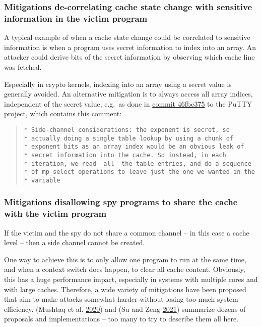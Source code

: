 \documentclass[a4paper,]{report}
\begin{document}
\hypertarget{mitigations-de-correlating-cache-state-change-with-sensitive-information-in-the-victim-program}{%
\subsubsection{Mitigations de-correlating cache state change with
sensitive information in the victim
program}\label{mitigations-de-correlating-cache-state-change-with-sensitive-information-in-the-victim-program}}

A typical example of when a cache state change could be correlated to
sensitive information is when a program uses secret information to index
into an array. An attacker could derive bits of the secret information
by observing which cache line was fetched.

Especially in crypto kernels, indexing into an array using a secret
value is generally avoided. An alternative mitigation is to always
access all array indices, independent of the secret value, e.g.~as done
in
\href{https://git.tartarus.org/?p=simon/putty.git;a=commitdiff;h=46fbe375bf}{commit
46fbe375} to the PuTTY project, which contains this comment:

\begin{quote}
\begin{verbatim}
* Side-channel considerations: the exponent is secret, so
* actually doing a single table lookup by using a chunk of
* exponent bits as an array index would be an obvious leak of
* secret information into the cache. So instead, in each
* iteration, we read _all_ the table entries, and do a sequence
* of mp_select operations to leave just the one we wanted in the
* variable
\end{verbatim}
\end{quote}

\hypertarget{mitigations-disallowing-spy-programs-to-share-the-cache-with-the-victim-program}{%
\subsubsection{Mitigations disallowing spy programs to share the cache
with the victim
program}\label{mitigations-disallowing-spy-programs-to-share-the-cache-with-the-victim-program}}

If the victim and the spy do not share a common channel -- in this case
a cache level -- then a side channel cannot be created.

One way to achieve this is to only allow one program to run at the same
time, and when a context switch does happen, to clear all cache content.
Obviously, this has a huge performance impact, especially in systems
with multiple cores and with large caches. Therefore, a wide variety of
mitigations have been proposed that aim to make attacks somewhat harder
without losing too much system efficiency. (Mushtaq et al.
\protect\hyperlink{ref-Mushtaq2020}{2020}) and (Su and Zeng
\protect\hyperlink{ref-Su2021}{2021}) summarize dozens of proposals and
implementations -- too many to try to describe them all here.
\end{document}
